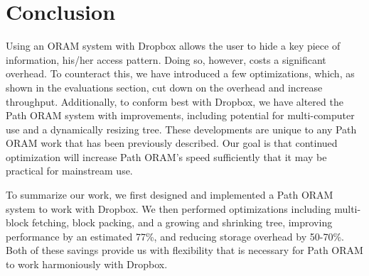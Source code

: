 \documentclass[conference]{IEEEtran}
\begin{document}



\section{Conclusion}
Using an ORAM system with Dropbox allows the user to hide a key piece of information, his/her access pattern. Doing so, however, costs a significant overhead. To counteract this, we have introduced a few optimizations, which, as shown in the evaluations section, cut down on the overhead and increase throughput. Additionally, to conform best with Dropbox, we have altered the Path ORAM system with improvements, including potential for multi-computer use and a dynamically resizing tree. These developments are unique to any Path ORAM work that has been previously described. Our goal is that continued optimization will increase Path ORAM’s speed sufficiently that it may be practical for mainstream use. 

To summarize our work, we first designed and implemented a Path ORAM system to work with Dropbox. We then performed optimizations including multi-block fetching, block packing, and a growing and shrinking tree, improving performance by an estimated 77\%, and reducing storage overhead by 50-70\%. Both of these savings provide us with flexibility that is necessary for Path ORAM to work harmoniously with Dropbox.








%
%
%






\end{document}
